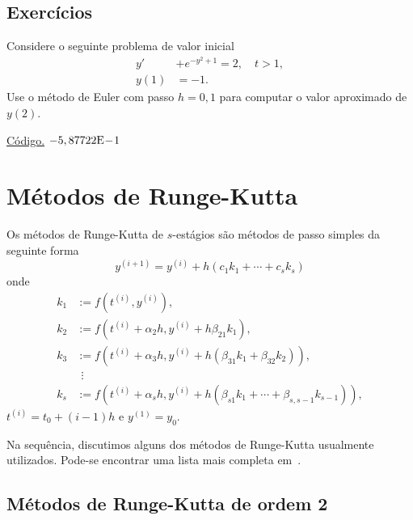 \subsection*{Exercícios}

\begin{exer}
  Considere o seguinte problema de valor inicial
  \begin{align}
    y' &+ e^{-y^2+1} = 2,\quad t>1,\\
    y(1) &= -1.
  \end{align}
Use o método de Euler com passo $h=0,1$ para computar o valor aproximado de $y(2)$.
\end{exer}
\begin{resp}
  \ifisoctave 
  \href{https://github.com/phkonzen/notas/blob/master/src/MatematicaNumerica/cap_pvi/dados/exer_Euler_pvi1/exer_Euler_pvi1.m}{Código.} 
  \fi
  $-5,87722\mathrm{E}\!-\!1$
\end{resp}


\section{Métodos de Runge-Kutta}\label{cap_pvi_sec_RK}

Os métodos de Runge-Kutta de $s$-estágios são métodos de passo simples da seguinte forma
\begin{equation}
  y^{(i+1)} = y^{(i)} + h(c_1k_1 + \cdots + c_sk_s)
\end{equation}
onde
\begin{align}
  k_1 &:= f(t^{(i)},y^{(i)}),\\
  k_2 &:= f(t^{(i)}+\alpha_2h,y^{(i)}+h\beta_{21}k_1),\\
  k_3 &:= f(t^{(i)}+\alpha_3h,y^{(i)}+h(\beta_{31}k_1+\beta_{32}k_2)),\\
      &~~\vdots\\
  k_s &:= f(t^{(i)}+\alpha_sh,y^{(i)}+h(\beta_{s1}k_1+\cdots+\beta_{s,s-1}k_{s-1})),
\end{align}
$t^{(i)}=t_0+(i-1)h$ e $y^{(1)}=y_0$.

Na sequência, discutimos alguns dos métodos de Runge-Kutta usualmente utilizados. Pode-se encontrar uma lista mais completa em~\cite[Cap. 8, Seç. 3.2]{Isaacson1994a}.

\subsection{Métodos de Runge-Kutta de ordem 2}

